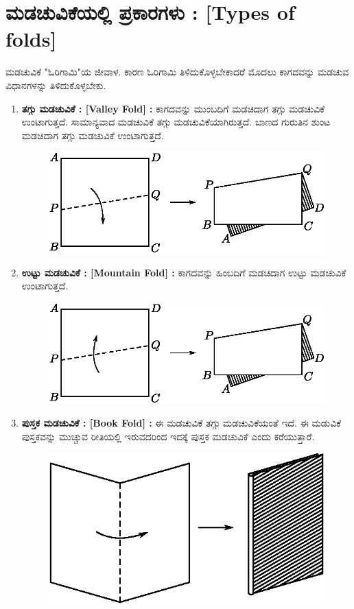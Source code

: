 \section{ಮಡಚುವಿಕೆಯಲ್ಲಿ ಪ್ರಕಾರಗಳು : [Types of folds]}
ಮಡಚುವಿಕೆ "ಓರಿಗಾಮಿ"ಯ ಜೀವಾಳ. ಕಾರಣ ಓರಿಗಾಮಿ ತಿಳಿದುಕೊಳ್ಳಬೇಕಾದರೆ ಮೊದಲು ಕಾಗದವನ್ನು ಮಡಚುವ ವಿಧಾನಗಳನ್ನು ತಿಳಿದುಕೊಳ್ಳಬೇಕು. 
\begin{enumerate}
\item \textbf{ತಗ್ಗು ಮಡಚುವಿಕೆ : [Valley Fold] :} ಕಾಗದವನ್ನು ಮುಂಬದಿಗೆ ಮಡಚಿದಾಗ ತಗ್ಗು ಮಡಚುವಿಕೆ ಉಂಟಾಗುತ್ತದೆ. ಸಾಮಾನ್ಯವಾದ ಮಡಚುವಿಕೆ ತಗ್ಗು ಮಡಚುವಿಕೆಯಾಗಿರುತ್ತದೆ. ಬಾಣದ ಗುರುತಿನ  ಶುಂಟ ಮಡಚಿದಾಗ ತಗ್ಗು ಮಡಚುವಿಕೆ ಉಂಟಾಗುತ್ತದೆ. 
\begin{figure}[H]
\centering
\includegraphics[scale=.98]{src/figure/chap1/fig1-1.eps}
\end{figure}

\item  \textbf{ಉಟ್ಟು ಮಡಚುವಿಕೆ : [Mountain Fold] :} ಕಾಗದವನ್ನು ಹಿಂಬದಿಗೆ ಮಡಚಿದಾಗ ಉಟ್ಟು ಮಡಚುವಿಕೆ ಉಂಟಾಗುತ್ತದೆ. 
\begin{figure}[H]
\centering
\includegraphics[scale=.98]{src/figure/chap1/fig1-2.eps}
\end{figure}


\item  \textbf{ಪುಸ್ತಕ ಮಡಚುವಿಕೆ : [Book Fold] :} 
ಈ ಮಡಚುವಿಕೆ ತಗ್ಗು ಮಡಚುವಿಕೆಯಂತೆ ಇದೆ. ಈ ಮಡುವಿಕೆ ಪುಸ್ತಕವನ್ನು ಮುಚ್ಚುವ ರೀತಿಯಲ್ಲಿ ಇರುವದರಿಂದ ಇದಕ್ಕೆ ಪುಸ್ತಕ ಮಡಚುವಿಕೆ ಎಂದು ಕರೆಯುತ್ತಾರೆ. 
\begin{figure}[H]
\centering
\includegraphics[scale=.98]{src/figure/chap1/fig1-3.eps}
\end{figure}



\end{enumerate}
